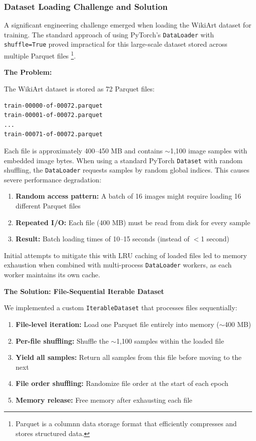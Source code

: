\subsubsection{Dataset Loading Challenge and Solution}
\label{sec:wikiart-dataloader}

A significant engineering challenge emerged when loading the WikiArt dataset for training. The standard approach of using PyTorch's \texttt{DataLoader} with \texttt{shuffle=True} proved impractical for this large-scale dataset stored across multiple Parquet files \footnote{Parquet is a columnn data storage format that efficiently compresses and stores structured data.}.

\textbf{The Problem:}

The WikiArt dataset is stored as 72 Parquet files:
\begin{verbatim}
train-00000-of-00072.parquet
train-00001-of-00072.parquet
...
train-00071-of-00072.parquet
\end{verbatim}

Each file is approximately 400--450 MB and contains $\sim$1,100 image samples with embedded image bytes. When using a standard PyTorch \texttt{Dataset} with random shuffling, the \texttt{DataLoader} requests samples by random global indices. This causes severe performance degradation:

\begin{enumerate}
    \item \textbf{Random access pattern:} A batch of 16 images might require loading 16 different Parquet files
    \item \textbf{Repeated I/O:} Each file (400 MB) must be read from disk for every sample
    \item \textbf{Result:} Batch loading times of 10--15 seconds (instead of $<$1 second)
\end{enumerate}

Initial attempts to mitigate this with LRU caching of loaded files led to memory exhaustion when combined with multi-process \texttt{DataLoader} workers, as each worker maintains its own cache.

\textbf{The Solution: File-Sequential Iterable Dataset}

We implemented a custom \texttt{IterableDataset} that processes files sequentially:

\begin{enumerate}
    \item \textbf{File-level iteration:} Load one Parquet file entirely into memory ($\sim$400 MB)
    \item \textbf{Per-file shuffling:} Shuffle the $\sim$1,100 samples within the loaded file
    \item \textbf{Yield all samples:} Return all samples from this file before moving to the next
    \item \textbf{File order shuffling:} Randomize file order at the start of each epoch
    \item \textbf{Memory release:} Free memory after exhausting each file
\end{enumerate}

